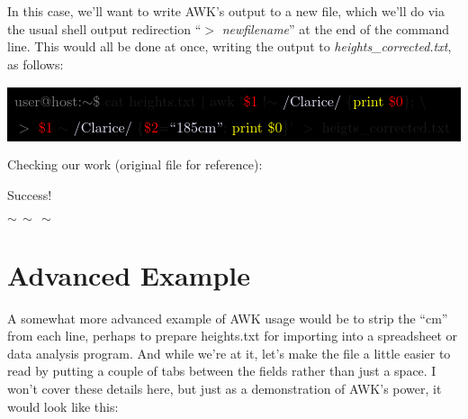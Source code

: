 \documentclass[10pt,a4]{article}
\begin{document}
In this case, we'll want to write AWK's output to a new file, which we'll do via the usual shell output redirection ``$>$ \emph{newfilename}'' at the end of the command line.
This would all be done at once, writing the output to \textit{heights\_corrected.txt}, as follows:

\ttfamily
\colorbox{black}{\textcolor{white}{
\begin{tabular}{l}
\textcolor{gray}{user@host:$\sim$\$ } cat heights.txt | awk '\textcolor{red}{\$1} !$\sim$ \textcolor{lavender}{/Clarice/} \{\textcolor{yellow}{print} \textcolor{red}{\$0}\}; \textbackslash \\
\textcolor{gray}{$>$} \textcolor{red}{\$1} $\sim$ \textcolor{lavender}{/Clarice/} \{\textcolor{red}{\$2}=\textcolor{lavender}{``185cm''}; \textcolor{yellow}{print \$0}\}' $>$ heigts\_corrected.txt
\end{tabular} }}
\normalfont

Checking our work (original file for reference):

\ttfamily
\colorbox{black}{}
\normalfont

\ttfamily
\colorbox{black}{}
\normalfont

\ttfamily
\colorbox{black}{}
\normalfont

Success!

\large
$\sim \, \sim \, \sim$
\normalsize



\pagebreak


\section*{Advanced Example}

A somewhat more advanced example of AWK usage would be to strip the ``cm'' from each line, perhaps to prepare heights.txt for importing into a spreadsheet or data analysis program.
And while we're at it, let's make the file a little easier to read by putting a couple of tabs between the fields rather than just a space.
I won't cover these details here, but just as a demonstration of AWK's power, it would look like this:
\end{document}

